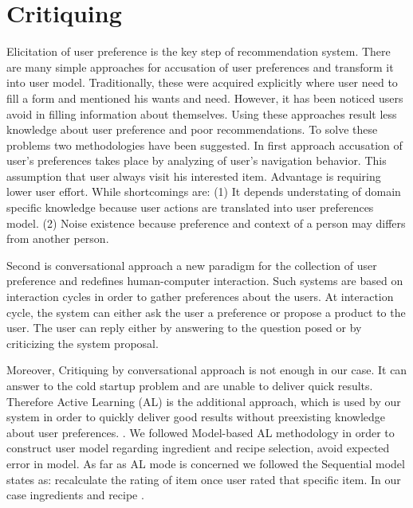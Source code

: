 \section{Critiquing}

Elicitation of user preference is the key step of recommendation system. There are many simple approaches for accusation of user preferences and transform it into user model. Traditionally, these were acquired explicitly where user need to fill a form and mentioned his wants and need. However, it has been noticed users avoid in filling information about themselves. Using these approaches result less knowledge about user preference and poor recommendations. To solve these problems two methodologies have been suggested. In first approach accusation of user’s preferences takes place by analyzing of user’s navigation behavior. This assumption that user always visit his interested item. Advantage is requiring lower user effort. While shortcomings are: (1) It depends understating of domain specific knowledge because user actions are translated into user preferences model. (2) Noise existence because preference and context of a person may differs from another person.\newline

Second is conversational approach a new paradigm for the collection of user preference and redefines human-computer interaction. Such systems are based on interaction cycles in order to gather preferences about the users. At interaction cycle, the system can either ask the user a preference or propose a product to the user. The user can reply either by answering to the question posed or by criticizing the system proposal.\cite{ricci2005critique}\newline

Moreover, Critiquing by conversational approach is not enough in our case. It can answer to the cold startup problem and are unable to deliver quick results. Therefore Active Learning (AL) is the additional approach, which is used by our system in order to quickly deliver good results without preexisting knowledge about user preferences. \cite{lamche2014active}. We followed Model-based AL methodology in order to construct user model regarding ingredient and recipe selection, avoid expected error in model. As far as AL mode is concerned we followed the Sequential model states as: recalculate the rating of item once user rated that specific item. In our case ingredients and recipe \cite{rashid2008learning}.

